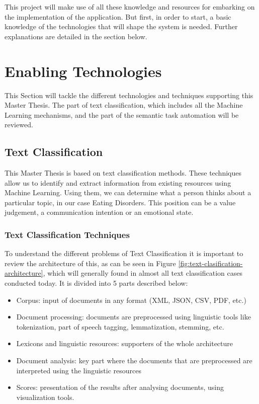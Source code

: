 

This project will make use of all these knowledge and resources for embarking on the implementation of the application. But first, in order to start, a basic knowledge of the technologies that will shape the system is needed. Further explanations are detailed in the section below. 


\section{Enabling Technologies}
This Section will tackle the different technologies and techniques supporting this Master Thesis. The part of text classification, which includes all the Machine Learning mechanisms, and the part of the semantic task automation will be reviewed.


\subsection{Text Classification}
This Master Thesis is based on text classification methods. These techniques allow us to identify and extract information from existing resources using Machine Learning. Using them, we can determine what a person thinks about a particular topic, in our case Eating Disorders. This position can be a value judgement, a communication intention or an emotional state.

\subsubsection{Text Classification Techniques}

To understand the different problems of Text Classification it is important to review the architecture of this, as can be seen in Figure \ref{fig:text-clasification-architecture}, which will generally found in almost all text classification cases conducted today. It is divided into 5 parts described below:


\begin{itemize}
    \item Corpus: input of documents in any format (XML, JSON, CSV, PDF, etc.)
    \item Document processing: documents are preprocessed using linguistic tools like tokenization, part of speech tagging, lemmatization, stemming, etc.
    \item Lexicons and linguistic resources: supporters of the whole architecture
    \item Document analysis: key part where the documents that are preprocessed are interpreted using the linguistic resources
    \item Scores: presentation of the results after analysing documents, using visualization tools.
\end{itemize}


